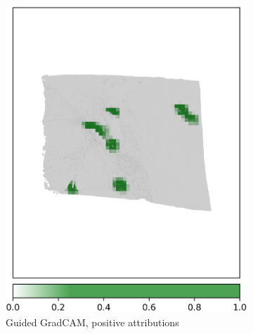 \begin{figure}[h!t]
\begin{subfigure}[b]{0.49\textwidth}
         \includegraphics[width=\textwidth]{latex/captum/case13/guided_gradcam_pos_case13-stain41-dead_2415days.png}
         \caption{Guided GradCAM, positive attributions}
     \end{subfigure}
    \hfill
     \begin{subfigure}[b]{0.49\textwidth}
         \centering

\end{subfigure}
\end{figure}
